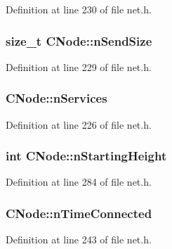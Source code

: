 Definition at line 230 of file net.\+h.

\hypertarget{class_c_node_a3c99b7e2b0e53feb58f6859453456f74}{}
\subsubsection[{n\+Send\+Size}]{\setlength{\rightskip}{0pt plus 5cm}size\+\_\+t C\+Node\+::n\+Send\+Size}\label{class_c_node_a3c99b7e2b0e53feb58f6859453456f74}


Definition at line 229 of file net.\+h.

\hypertarget{class_c_node_a8259db81211f6837585c6f82f89414ff}{}
\subsubsection[{n\+Services}]{ C\+Node\+::n\+Services}\label{class_c_node_a8259db81211f6837585c6f82f89414ff}


Definition at line 226 of file net.\+h.

\hypertarget{class_c_node_a597b41bd64e2ac9391b7211e65aeb52a}{}
\subsubsection[{n\+Starting\+Height}]{\setlength{\rightskip}{0pt plus 5cm}int C\+Node\+::n\+Starting\+Height}\label{class_c_node_a597b41bd64e2ac9391b7211e65aeb52a}


Definition at line 284 of file net.\+h.

\hypertarget{class_c_node_abb39393ef08cb5668ded6cb14cdbc147}{}
\subsubsection[{n\+Time\+Connected}]{ C\+Node\+::n\+Time\+Connected}\label{class_c_node_abb39393ef08cb5668ded6cb14cdbc147}


Definition at line 243 of file net.\+h.

